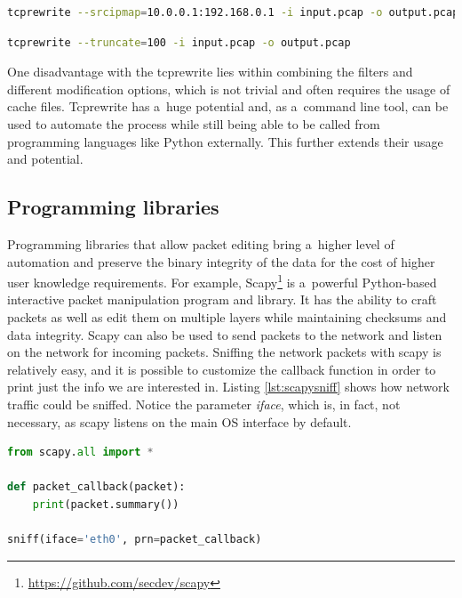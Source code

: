 \documentclass[
  printed,     %
  color,       %
  oneside,     %
  nosansbold,  %
  nocolorbold, %
  nolof,         %
  nolot,         %
]{fithesis4}
\begin{document}
\begin{lstlisting}[language=bash, caption={Modify the source IP address of a~packet capture}, label={lst:tcpmod}]
tcprewrite --srcipmap=10.0.0.1:192.168.0.1 -i input.pcap -o output.pcap
\end{lstlisting}

\begin{lstlisting}[language=bash, caption={Truncate packet data in a~packet capture}, label={lst:tcptrunc}]
tcprewrite --truncate=100 -i input.pcap -o output.pcap
\end{lstlisting}

 One disadvantage with the tcprewrite lies within combining the filters and different modification options, which is not trivial and often requires the usage of cache files. Tcprewrite has a~huge potential and, as a~command line tool, can be used to automate the process while still being able to be called from programming languages like Python externally. This further extends their usage and potential.

\subsection{Programming libraries}

Programming libraries that allow packet editing bring a~higher level of automation and preserve the binary integrity of the data for the cost of higher user knowledge requirements. For example, Scapy\footnote{\url{https://github.com/secdev/scapy}} is a~powerful Python-based interactive packet manipulation program and library. It has the ability to craft packets as well as edit them on multiple layers while maintaining checksums and data integrity. Scapy can also be used to send packets to the network and listen on the network for incoming packets. Sniffing the network packets with scapy is relatively easy, and it is possible to customize the callback function in order to print just the info we are interested in. Listing \ref{lst:scapysniff} shows how network traffic could be sniffed. Notice the parameter \textit{iface}, which is, in fact, not necessary, as scapy listens on the main OS interface by default.

\begin{lstlisting}[language=python, caption={Sniffing network traffic}, label={lst:scapysniff}]
from scapy.all import *

def packet_callback(packet):
    print(packet.summary())

sniff(iface='eth0', prn=packet_callback)
\end{lstlisting}
\end{document}

